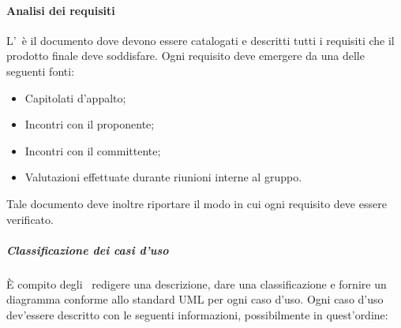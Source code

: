 \documentclass[../NormeProgetto.tex]{subfiles}
\begin{document}
			\paragraph{Analisi dei requisiti}
			L'\analisideirequisiti\ è il documento dove devono essere catalogati e descritti tutti i requisiti che il prodotto finale deve soddisfare. Ogni requisito deve emergere da una delle seguenti fonti:
			\begin{itemize}
				\item Capitolati d'appalto;
				\item Incontri con il proponente;
				\item Incontri con il committente;
				\item Valutazioni effettuate durante riunioni interne al gruppo.
			\end{itemize}
			Tale documento deve inoltre riportare il modo in cui ogni requisito deve essere verificato.
				\subparagraph{Classificazione dei casi d'uso}
				È compito degli \analisti\ redigere una descrizione, dare una classificazione e fornire un diagramma conforme allo standard UML per ogni caso d'uso. Ogni caso d'uso dev'essere descritto con le seguenti informazioni, possibilmente in quest'ordine:
\end{document}
